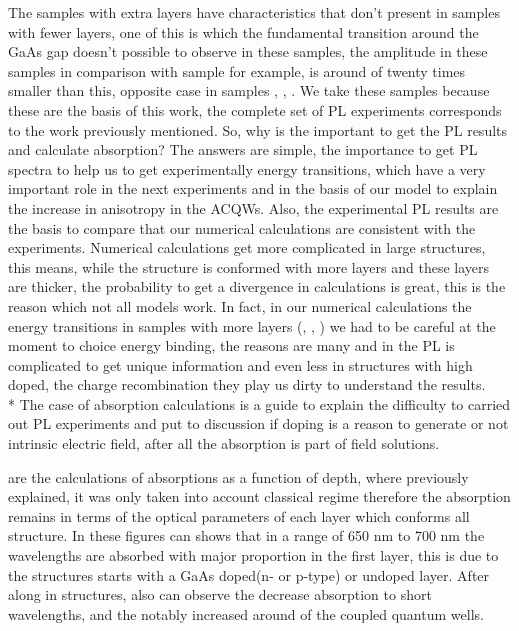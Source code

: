 The samples with extra layers have characteristics that don't present in samples with fewer layers, one of this is which the fundamental transition around the GaAs gap doesn't possible to observe in these samples, the amplitude in these samples in comparison with sample  for example, is around of twenty times smaller than this, opposite case in samples , , . We take these samples because these are the basis of this work, the complete set of PL experiments corresponds to the work previously mentioned. So, why is the important to get the PL results and calculate absorption?
The answers are simple, the importance to get PL spectra to help us to get experimentally energy transitions, which have a very important role in the next experiments and in the basis of our model to explain the increase in anisotropy in the ACQWs.  Also, the experimental PL results are the basis to compare that our numerical calculations are consistent with the experiments. Numerical calculations get more complicated in large structures, this means, while the structure is conformed with more layers and these layers are thicker, the probability to get a divergence in calculations is great, this is the reason which not all models work. In fact, in our numerical calculations the energy transitions in samples with more layers (, , ) we had to be careful at the moment to choice energy binding, the reasons are many and in the PL is complicated to get unique information and even less in structures with high doped, the charge recombination they play us dirty to understand the results. \\*
The case of absorption calculations is a guide to explain the difficulty to carried out PL experiments and put to discussion if doping is a reason to generate or not intrinsic electric field, after all the absorption is part of field solutions. 

 are the calculations of absorptions as a function of depth, where previously explained, it was only taken into account classical regime therefore the absorption remains in terms of the optical parameters of each layer which conforms all structure. In these figures can shows that in a range of 650 nm to 700 nm the wavelengths are absorbed with major proportion in the first layer, this is due to the structures starts with a GaAs doped(n- or p-type) or undoped layer. After along in structures, also can observe the  decrease absorption to short wavelengths, and the notably increased around of the coupled quantum wells.


